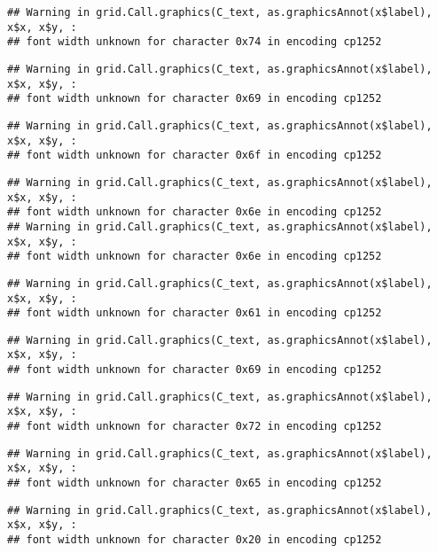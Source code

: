 \documentclass[
]{article}
\begin{document}
\begin{verbatim}
## Warning in grid.Call.graphics(C_text, as.graphicsAnnot(x$label), x$x, x$y, :
## font width unknown for character 0x74 in encoding cp1252
\end{verbatim}

\begin{verbatim}
## Warning in grid.Call.graphics(C_text, as.graphicsAnnot(x$label), x$x, x$y, :
## font width unknown for character 0x69 in encoding cp1252
\end{verbatim}

\begin{verbatim}
## Warning in grid.Call.graphics(C_text, as.graphicsAnnot(x$label), x$x, x$y, :
## font width unknown for character 0x6f in encoding cp1252
\end{verbatim}

\begin{verbatim}
## Warning in grid.Call.graphics(C_text, as.graphicsAnnot(x$label), x$x, x$y, :
## font width unknown for character 0x6e in encoding cp1252
## Warning in grid.Call.graphics(C_text, as.graphicsAnnot(x$label), x$x, x$y, :
## font width unknown for character 0x6e in encoding cp1252
\end{verbatim}

\begin{verbatim}
## Warning in grid.Call.graphics(C_text, as.graphicsAnnot(x$label), x$x, x$y, :
## font width unknown for character 0x61 in encoding cp1252
\end{verbatim}

\begin{verbatim}
## Warning in grid.Call.graphics(C_text, as.graphicsAnnot(x$label), x$x, x$y, :
## font width unknown for character 0x69 in encoding cp1252
\end{verbatim}

\begin{verbatim}
## Warning in grid.Call.graphics(C_text, as.graphicsAnnot(x$label), x$x, x$y, :
## font width unknown for character 0x72 in encoding cp1252
\end{verbatim}

\begin{verbatim}
## Warning in grid.Call.graphics(C_text, as.graphicsAnnot(x$label), x$x, x$y, :
## font width unknown for character 0x65 in encoding cp1252
\end{verbatim}

\begin{verbatim}
## Warning in grid.Call.graphics(C_text, as.graphicsAnnot(x$label), x$x, x$y, :
## font width unknown for character 0x20 in encoding cp1252
\end{verbatim}
\end{document}
